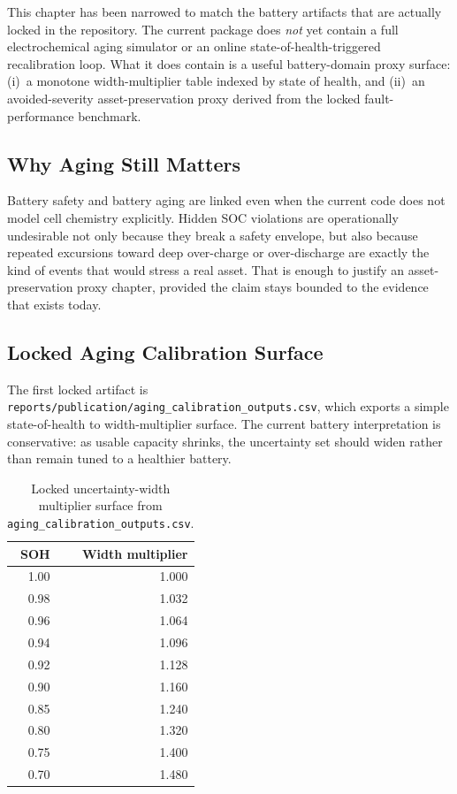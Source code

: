 This chapter has been narrowed to match the battery artifacts that are
actually locked in the repository.  The current package does \emph{not}
yet contain a full electrochemical aging simulator or an online
state-of-health-triggered recalibration loop.  What it does contain is a
useful battery-domain proxy surface: (i)~a monotone width-multiplier table
indexed by state of health, and (ii)~an avoided-severity asset-preservation
proxy derived from the locked fault-performance benchmark.

\subsection{Why Aging Still Matters}

Battery safety and battery aging are linked even when the current code
does not model cell chemistry explicitly.  Hidden SOC violations are
operationally undesirable not only because they break a safety envelope,
but also because repeated excursions toward deep over-charge or
over-discharge are exactly the kind of events that would stress a real
asset.  That is enough to justify an asset-preservation proxy chapter,
provided the claim stays bounded to the evidence that exists today.

\subsection{Locked Aging Calibration Surface}

The first locked artifact is
\texttt{reports/publication/aging\_calibration\_outputs.csv}, which exports a
simple state-of-health to width-multiplier surface.  The current battery
interpretation is conservative: as usable capacity shrinks, the uncertainty
set should widen rather than remain tuned to a healthier battery.

\begin{table}[ht]
\centering
\caption{Locked uncertainty-width multiplier surface from
  \texttt{aging\_calibration\_outputs.csv}.}
\label{tab:aging-multiplier}
\begin{tabular}{rr}
\toprule
\textbf{SOH} & \textbf{Width multiplier} \\
\midrule
1.00 & 1.000 \\
0.98 & 1.032 \\
0.96 & 1.064 \\
0.94 & 1.096 \\
0.92 & 1.128 \\
0.90 & 1.160 \\
0.85 & 1.240 \\
0.80 & 1.320 \\
0.75 & 1.400 \\
0.70 & 1.480 \\
\bottomrule
\end{tabular}
\end{table}

